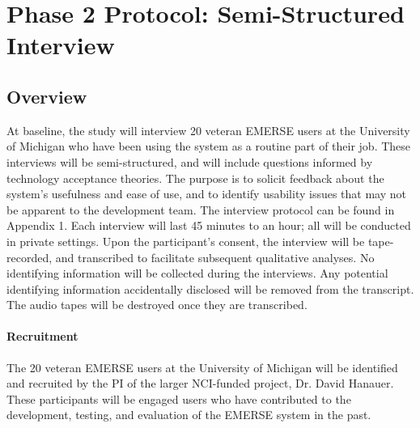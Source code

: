 
\chapter{Phase 2 Protocol: Semi-Structured Interview}


\section{Overview}
At baseline, the study will interview 20 veteran EMERSE users at the University of Michigan who have been using the system as a routine part of their job. These interviews will be semi-structured, and will include questions informed by technology acceptance theories. The purpose is to solicit feedback about the system’s usefulness and ease of use, and to identify usability issues that may not be apparent to the development team. The interview protocol can be found in Appendix 1. Each interview will last 45 minutes to an hour; all will be conducted in private settings. Upon the participant’s consent, the interview will be tape-recorded, and transcribed to facilitate subsequent qualitative analyses. No identifying information will be collected during the interviews. Any potential identifying information accidentally disclosed will be removed from the transcript. The audio tapes will be destroyed once they are transcribed.
\subsubsection{Recruitment}
The 20 veteran EMERSE users at the University of Michigan will be identified and recruited by the PI of the larger NCI-funded project, Dr. David Hanauer. These participants will be engaged users who have contributed to the development, testing, and evaluation of the EMERSE system in the past.
